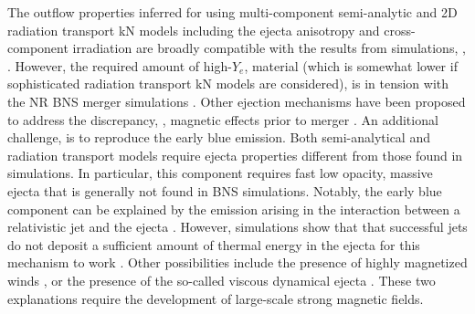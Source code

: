 The outflow properties inferred for \AT{} using multi-component semi-analytic and 
2D radiation transport \ac{kN} models including the ejecta anisotropy and 
cross-component irradiation are broadly compatible with the results from simulations, 
\eg, \citep{Kawaguchi:2018ptg}. %
%
However, the required amount of high-$Y_e$, material 
(which is somewhat lower if sophisticated radiation transport 
\ac{kN} models are considered), is in tension with the \ac{NR} \ac{BNS} merger simulations 
\citep{Sekiguchi:2016bjd,Siegel:2019mlp,Perego:2017wtu,Kawaguchi:2018ptg}.
%
Other ejection mechanisms have been proposed to address the discrepancy, \eg, 
magnetic effects prior to merger \citep{Metzger:2018qfl,Fernandez:2018kax,Radice:2018ghv}. 
An additional challenge, is to reproduce the early blue emission. 
Both semi-analytical and radiation transport models require ejecta properties 
different from those found in simulations. In particular, this component 
requires fast low opacity, massive ejecta \citep{Fahlman:2018llv} that is generally 
not found in \ac{BNS} simulations.
Notably, the early blue component can be explained by the emission arising 
in the interaction between a relativistic jet and the ejecta
\citep{Lazzati:2016yxl,Bromberg:2017crh,Piro:2017ayh}.
However, simulations show that that successful jets do not deposit a sufficient amount of thermal energy in the ejecta for this mechanism to work \citep{Duffell:2018iig}. 
Other possibilities include the presence of highly magnetized winds \citep{Metzger:2018uni,Fernandez:2018kax},
or the presence of the so-called viscous dynamical ejecta \citep{Radice:2018ghv}.
These two explanations require the development of large-scale strong magnetic fields.



